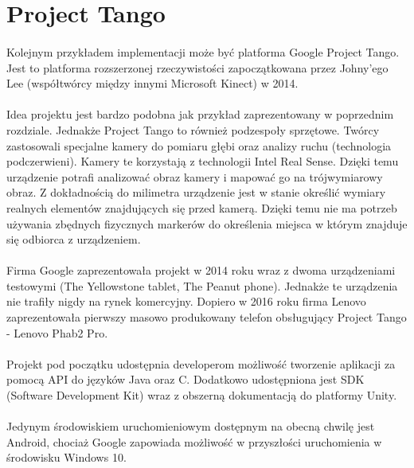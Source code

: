 \section{Project Tango}
\paragraph{}
Kolejnym przykładem implementacji może być platforma Google Project Tango\cite{tango}. Jest to platforma rozszerzonej rzeczywistości zapoczątkowana przez Johny'ego Lee (współtwórcy między innymi Microsoft Kinect\cite{autor}) w 2014. 
\paragraph{}
Idea projektu jest bardzo podobna jak przykład zaprezentowany w poprzednim rozdziale. Jednakże Project Tango to również podzespoły sprzętowe. Twórcy zastosowali specjalne kamery do pomiaru głębi oraz analizy ruchu (technologia podczerwieni). Kamery te korzystają z technologii Intel Real Sense. Dzięki temu urządzenie potrafi analizować obraz kamery i mapować go na trójwymiarowy obraz. Z dokładnością do milimetra urządzenie jest w stanie określić wymiary realnych elementów znajdujących się przed kamerą. Dzięki temu nie ma potrzeb używania zbędnych fizycznych markerów do określenia miejsca w którym znajduje się odbiorca z urządzeniem.
\paragraph{}
Firma Google zaprezentowała projekt w 2014 roku wraz z dwoma urządzeniami testowymi (The Yellowstone tablet,  The Peanut phone). Jednakże te urządzenia nie trafiły nigdy na rynek komercyjny. Dopiero w 2016 roku firma Lenovo zaprezentowała pierwszy masowo produkowany telefon obsługujący Project Tango - Lenovo Phab2 Pro.
\paragraph{}
Projekt pod początku udostępnia developerom możliwość tworzenie aplikacji za pomocą API do języków Java oraz C. Dodatkowo udostępniona jest SDK (Software Development Kit) wraz z obszerną dokumentacją do platformy Unity\cite{tangounity}.
\paragraph{}
Jedynym środowiskiem uruchomieniowym dostępnym na obecną chwilę jest Android, chociaż Google zapowiada możliwość w przyszłości uruchomienia w środowisku Windows 10.

